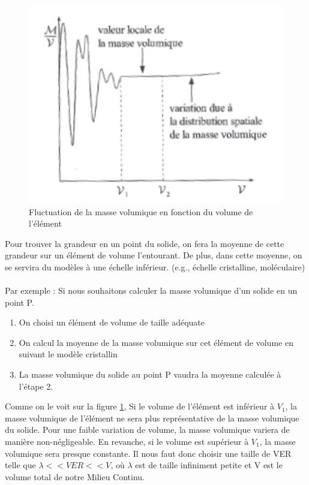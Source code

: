 \begin{figure}[H]
    \centering
    \includegraphics[scale = 0.5]{Images/Images_Introduciton/VER_Graphe.png}
    \caption{Fluctuation de la masse volumique en fonction du volume de l'élément \protect \footnotemark}
    \label{fig:fluctuationsVER}
\end{figure}

Pour trouver la grandeur en un point du solide, on fera la moyenne de cette grandeur sur un élément de volume l'entourant. De plus, dans cette moyenne, on se servira du modèles à une échelle inférieur. (e.g., échelle cristalline, moléculaire)\\
\\
Par exemple : Si nous souhaitons calculer la masse volumique d'un solide en un point P.
\begin{enumerate}
    \item On choisi un élément de volume de taille adéquate
    \item On calcul la moyenne de la masse volumique sur cet élément de volume en suivant le modèle cristallin
    \item La masse volumique du solide au point P vaudra la moyenne calculée à l'étape 2.
\end{enumerate}
Comme on le voit sur la figure \ref{fig:fluctuationsVER}, Si le volume de l'élément est inférieur à $V_1$, la masse volumique de l'élément ne sera plus représentative de la masse volumique du solide. Pour une faible variation de volume, la masse volumique variera de manière non-négligeable. En revanche, si le volume est supérieur à $V_1$, la masse volumique sera presque constante. Il nous faut donc choisir une taille de VER telle que $\lambda << VER << V$, où $\lambda$  est de taille infiniment petite et V est le volume total de notre Milieu Continu.\\

